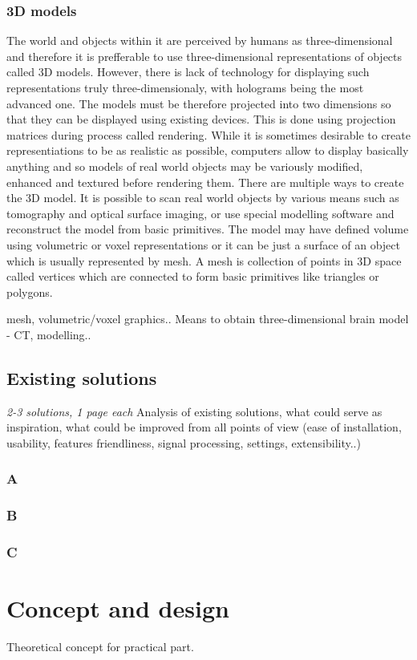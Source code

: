 \subsection{3D models}
The world and objects within it are perceived by humans as three-dimensional and
therefore it is prefferable to use three-dimensional representations of objects
called 3D models. However, there is lack of technology for displaying such
representations truly three-dimensionaly, with holograms being the most advanced
one. The models must be therefore projected into two dimensions so that they can
be displayed using existing devices. This is done using projection matrices
during process called rendering. While it is sometimes desirable to create
representiations to be as realistic as possible, computers allow to display
basically anything and so models of real world objects may be variously
modified, enhanced and textured before rendering them. There are multiple ways
to create the 3D model. It is possible to scan real world objects by various
means such as tomography and optical surface imaging, or use special modelling
software and reconstruct the model from basic primitives. The model may have
defined volume using volumetric or voxel representations or it can be just a
surface of an object which is usually represented by mesh. A mesh is collection
of points in 3D space called vertices which are connected to form basic
primitives like triangles or polygons.

mesh, volumetric/voxel graphics..
Means to obtain three-dimensional brain model - CT, modelling..
\section{Existing solutions}
\emph{2-3 solutions, 1 page each}
Analysis of existing solutions, what could serve as inspiration, what could be
improved from all points of view (ease of installation, usability, features
friendliness, signal processing, settings, extensibility..)
\subsection{A}
\subsection{B}
\subsection{C}
\chapter{Concept and design}
Theoretical concept for practical part.

